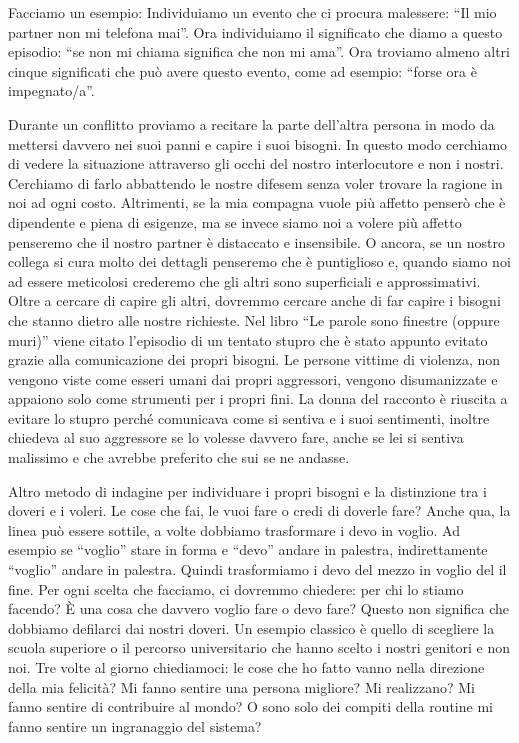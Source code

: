 \documentclass[12pt]{book} %
\begin{document}
Facciamo un esempio: Individuiamo un evento che ci procura malessere: “Il mio partner non mi telefona mai”. Ora
individuiamo il significato che diamo a questo episodio: “se non mi chiama significa che non mi ama”. Ora troviamo
almeno altri cinque significati che può avere questo evento, come ad esempio: “forse ora è impegnato/a”.

Durante un conflitto proviamo a recitare la parte dell'altra persona in modo da mettersi davvero nei suoi panni e capire
i suoi bisogni. In questo modo cerchiamo di vedere la situazione attraverso gli occhi del nostro interlocutore e non i
nostri. Cerchiamo di farlo abbattendo le nostre difesem senza voler trovare la ragione in noi ad ogni costo.
Altrimenti, se la mia compagna vuole più affetto penserò che è dipendente e piena di esigenze, ma se invece siamo noi a
volere più affetto penseremo che il nostro partner è distaccato e insensibile. O ancora, se un nostro collega si cura
molto dei dettagli penseremo che è puntiglioso e, quando siamo noi ad essere meticolosi crederemo che gli altri sono
superficiali e approssimativi. Oltre a cercare di capire gli altri, dovremmo cercare anche di far capire i bisogni che
stanno dietro alle nostre richieste. Nel libro “Le parole sono finestre (oppure
muri)” viene
citato l'episodio di un tentato stupro che è stato appunto evitato grazie alla comunicazione dei
propri bisogni. Le persone vittime di violenza, non vengono viste come esseri umani dai propri aggressori, vengono
disumanizzate e appaiono solo come strumenti per i propri fini. La donna del racconto è riuscita a evitare lo stupro
perché comunicava come si sentiva e i suoi sentimenti, inoltre chiedeva al suo aggressore se lo volesse davvero fare,
anche se lei si sentiva malissimo e che avrebbe preferito che sui se ne andasse. 

Altro metodo di indagine per individuare i propri bisogni e la distinzione tra i doveri e i voleri. Le cose che fai, le
vuoi fare o credi di doverle fare? Anche qua, la linea può essere sottile, a volte dobbiamo trasformare i devo in
voglio. Ad esempio se “voglio” stare in forma e “devo” andare in palestra, indirettamente “voglio” andare in palestra.
Quindi trasformiamo i devo del mezzo in voglio del il fine. Per ogni scelta che facciamo, ci dovremmo chiedere: per chi
lo stiamo facendo? È una cosa che davvero voglio fare o devo fare? Questo non significa che dobbiamo defilarci dai
nostri doveri. Un esempio classico è quello di scegliere la scuola superiore o il percorso universitario che hanno
scelto i nostri genitori e non noi. Tre volte al giorno chiediamoci: le cose che ho fatto vanno nella direzione della
mia felicità? Mi fanno sentire una persona migliore? Mi realizzano? Mi fanno sentire di contribuire al mondo? O sono
solo dei compiti della routine mi fanno sentire un ingranaggio del sistema?
\end{document}
